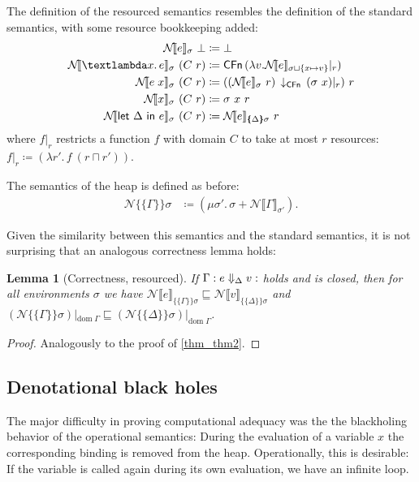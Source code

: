 \documentclass{jfp1}
\newtheorem{lemma}{Lemma}
\theoremstyle{nonumberbreak}
\newtheorem{proof}{Proof}
\newcommand{\sCFn}[1]{\text{\textsf{CFn}}\,(#1)}
\newcommand{\sCFnProj}[2]{#1\,\downarrow_{\text{\textsf{CFn}}}\,#2}
\newcommand{\keyword}[1]{\text{\textsf{#1}}}
\newcommand{\sApp}[2]{#1\;#2}
\newcommand{\sLam}[2]{\text{\textlambda} #1.\, #2}
\newcommand{\sLet}[2]{\keyword{let}~#1~\keyword{in}~#2}
\newcommand{\sred}[5]{#1 : #2 \Downarrow_{#3} #4 : #5}
\newcommand{\dom}[1]{\text{dom}\;#1}
\newcommand{\esem}[1]{\{\!\!\!\{#1\}\!\!\!\}}
\newcommand{\dsemr}[2]{\mathcal N\!\llbracket #1 \rrbracket_{#2}}
\newcommand{\esemr}[1]{\mathcal N\!\!\{\!\!\!\{#1\}\!\!\!\}}
\newcommand{\upd}[1]{\mathop{++_{#1}}}
\newcommand{\Crestr}[2]{ #1 |_{#2}}
\begin{document}
The definition of the resourced semantics resembles the definition of the standard semantics, with some resource bookkeeping added:
\begin{align*}
\dsemr{e}\sigma~ \bot &\coloneqq \bot\\
\dsemr{\sLam x e}\sigma ~ (C~r) &\coloneqq \sCFn{\lambda v. \Crestr{\dsemr e {\sigma \sqcup \{x \mapsto v\}}} r}\\
\dsemr{\sApp e  x}\sigma ~ (C~r) &\coloneqq (\sCFnProj {(\dsemr e \sigma~r)}{\Crestr{(\sigma~x)} r})~r\\
\dsemr{x}\sigma ~ (C~r) &\coloneqq \sigma~x~r\\
\dsemr{\sLet{\Delta}e}\sigma ~ (C~r) &\coloneqq \dsemr e {\esem{\Delta}\sigma}~r
\end{align*}
where $\Crestr{f}{r}$ restricts a function $f$ with domain $C$ to take at most $r$ resources: $\Crestr f r \coloneqq (\lambda r'.\, f ~(r \sqcap r'))$.

The semantics of the heap is defined as before:
\begin{align*}
\esemr{\Gamma}\sigma &\coloneqq (\mu \sigma'.\, \sigma \upd{\dom \Gamma} \dsemr{\Gamma}{\sigma'}).
\end{align*}

Given the similarity between this semantics and the standard semantics, it is not surprising that an analogous correctness lemma holds:

\begin{lemma}[Correctness, resourced]
If $\sred \Gamma e \Delta v$ holds and is closed, then for all environments $\sigma$ we have $\dsemr{e}{\esem{\Gamma}{\sigma}} \sqsubseteq \dsemr{v}{\esem{\Delta}{\sigma}}$ and $(\esemr\Gamma\sigma)|_{\dom\Gamma} \sqsubseteq (\esemr\Delta\sigma)|_{\dom\Gamma}$.%
\label{lem_resourced_correctness}
\end{lemma}

\begin{proof}
Analogously to the proof of \autoref{thm_thm2}.
\end{proof}

\subsection{Denotational black holes}
\label{sec_denblackhole}

The major difficulty in proving computational adequacy was the the blackholing behavior of the operational semantics: During the evaluation of a variable $x$ the corresponding binding is removed from the heap. Operationally, this is desirable: If the variable is called again during its own evaluation, we have an infinite loop.
\end{document}
